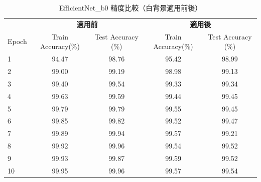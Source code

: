 \documentclass[a4paper,11pt,titlepage]{jsarticle}
\begin{document}
\begin{table}[H]
\centering
\caption{EfficientNet\_b0 精度比較（白背景適用前後）}
\label{tab:comparison_efficientnetb0}
\begin{tabular}{l|cc|cc}
\hline
      & \multicolumn{2}{c|}{\textbf{適用前 }} & \multicolumn{2}{c}{\textbf{適用後 }} \\ \cline{2-5} 
Epoch & Train Accuracy(\%) & Test Accuracy (\%) & Train Accuracy(\%) & Test Accuracy (\%) \\
\hline
1     & 94.47           & 98.76                & 95.42           & 98.99                \\
2     & 99.00           & 99.19                & 98.98           & 99.13                \\
3     & 99.40           & 99.54                & 99.33           & 99.34                \\
4     & 99.63           & 99.59                & 99.44           & 99.45                \\
5     & 99.79           & 99.79                & 99.55           & 99.45                \\
6     & 99.85           & 99.82                & 99.52           & 99.47                \\
7     & 99.89           & 99.94                & 99.57           & 99.21                \\
8     & 99.92           & 99.96                & 99.54           & 99.52                \\
9     & 99.93           & 99.87                & 99.59           & 99.52                \\
10    & 99.95           & 99.96                & 99.57           & 99.54                \\
\hline
\end{tabular}
\end{table}
\end{document}
